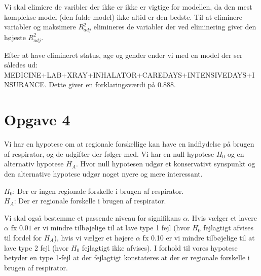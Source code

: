 \documentclass{article}
\begin{document}
Vi skal elimiere de varibler der ikke er ikke er vigtige for modellen, da den
mest komplekse model (den fulde model) ikke altid er den bedste. Til at
eliminere variabler og maksimere $ R^2_{adj} $ elimineres de variabler der ved
eliminering giver den højeste $ R^2_{adj} $. 

Efter at have elimineret status, age og gender ender vi med en model der ser
således ud: 
MEDICINE+LAB+XRAY+INHALATOR+CAREDAYS+INTENSIVEDAYS+INSURANCE. Dette giver en
forklaringsværdi på 0.888.

\section{Opgave 4}

Vi har en hypotese om at regionale forskellige kan have en indflydelse på brugen
af respirator, og de udgifter der følger med. Vi har en null hypotese $ H_0 $ og en
alternativ hypotese $ H_A $. Hvor null hypotesen udgør et konservativt synspunkt
og den alternative hypotese udgør noget nyere og mere interessant. 

\noindent$ H_0 $: Der er ingen regionale forskelle i brugen af respirator.\\
\noindent$ H_A $: Der er regionale forskelle i brugen af respirator.

Vi skal også bestemme et passende niveau for signifikans $ \alpha $. Hvis vælger
et lavere $\alpha$ fx $0.01$ er vi mindre tilbøjelige til at lave type 1 fejl
(hvor $ H_0 $ fejlagtigt afvises til fordel for  $ H_A $),
hvis vi vælger et højere $ \alpha $ fx 0.10 er vi mindre tilbøjelige til at lave type 2
fejl (hvor $ H_0 $ fejlagtigt ikke afvises). 
I forhold til vores hypotese betyder en type 1-fejl at der fejlagtigt
konstateres at der er regionale forskelle i brugen af respirator. 
\end{document}
